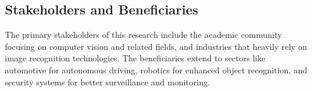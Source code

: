 \subsection{Stakeholders and Beneficiaries}
The primary stakeholders of this research include the academic community focusing on computer vision and related fields, and industries that heavily rely on image recognition technologies. The beneficiaries extend to sectors like automotive for autonomous driving, robotics for enhanced object recognition, and security systems for better surveillance and monitoring.

